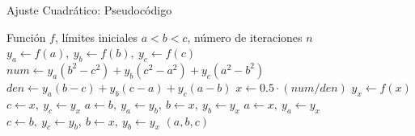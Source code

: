 \begin{frame}[fragile]{Ajuste Cuadrático: Pseudocódigo}
    \vspace{-1.2em}
    \begingroup
    \linespread{0.85}\selectfont
    \setlength{\lineskip}{0pt}
    \begin{algorithm}[H]
    \scriptsize
    \begin{algorithmic}[1]
        \Require Función \(f\), límites iniciales \(a < b < c\), número de iteraciones \(n\)
        \State \(y_a \gets f(a), \ y_b \gets f(b), \ y_c \gets f(c)\)
            \State \(num \gets y_a(b^2-c^2) + y_b(c^2-a^2) + y_c(a^2-b^2)\)
            \State \(den \gets y_a(b-c) + y_b(c-a) + y_c(a-b)\)
            \State \(x \gets 0.5 \cdot (num / den)\) 
            \State \(y_x \gets f(x)\)
                    \State \(c \gets x, \ y_c \gets y_x\)
                \Else
                    \State \(a \gets b, \ y_a \gets y_b, \ b \gets x, \ y_b \gets y_x\)
                \EndIf
                    \State \(a \gets x, \ y_a \gets y_x\)
                \Else
                    \State \(c \gets b, \ y_c \gets y_b, \ b \gets x, \ y_b \gets y_x\)
                \EndIf
            \EndIf
        \EndFor
        \State \Return \((a, b, c)\)
    \end{algorithmic}
    \end{algorithm}
    \endgroup
\end{frame}

